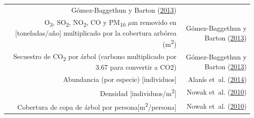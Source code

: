 \documentclass[12pt,a4paper,oneside, openany]{book}
\theoremstyle{definition}
\theoremstyle{definition}
\theoremstyle{definition}
\theoremstyle{remark}
\begin{document}
\begin{longtable}[]{@{}rr@{}}
\begin{minipage}[t]{0.31\columnwidth}
Gómez-Baggethun y Barton
(\protect\hyperlink{ref-gomez-baggethun_classifying_2013}{2013})\strut
\end{minipage}\tabularnewline
\begin{minipage}[t]{0.57\columnwidth}\raggedleft\strut
O\textsubscript{3}, SO\textsubscript{2}, NO\textsubscript{2}, CO y
PM\textsubscript{10} \(\mu\)m removido en {[}toneladas/año{]}
multiplicado por la cobertura arbórea (m\textsuperscript{2})\strut
\end{minipage} & \begin{minipage}[t]{0.31\columnwidth}\raggedleft\strut
Gómez-Baggethun y Barton
(\protect\hyperlink{ref-gomez-baggethun_classifying_2013}{2013})\strut
\end{minipage}\tabularnewline
\begin{minipage}[t]{0.57\columnwidth}\raggedleft\strut
Secuestro de CO\textsubscript{2} por árbol (carbono multiplicado por
3.67 para convertir a CO2)\strut
\end{minipage} & \begin{minipage}[t]{0.31\columnwidth}\raggedleft\strut
Gómez-Baggethun y Barton
(\protect\hyperlink{ref-gomez-baggethun_classifying_2013}{2013})\strut
\end{minipage}\tabularnewline
\begin{minipage}[t]{0.57\columnwidth}\raggedleft\strut
Abundancia (por especie) {[}individuos{]}\strut
\end{minipage} & \begin{minipage}[t]{0.31\columnwidth}\raggedleft\strut
Alanís et~al.
(\protect\hyperlink{ref-alanis_estructura_2014}{2014})\strut
\end{minipage}\tabularnewline
\begin{minipage}[t]{0.57\columnwidth}\raggedleft\strut
Densidad {[}individuos/m\textsuperscript{2}{]}\strut
\end{minipage} & \begin{minipage}[t]{0.31\columnwidth}\raggedleft\strut
Nowak et~al. (\protect\hyperlink{ref-nowak_sustaining_2010}{2010})\strut
\end{minipage}\tabularnewline
\begin{minipage}[t]{0.57\columnwidth}\raggedleft\strut
Cobertura de copa de árbol por
persona{[}m\textsuperscript{2}/persona{]}\strut
\end{minipage} & \begin{minipage}[t]{0.31\columnwidth}\raggedleft\strut
Nowak et~al. (\protect\hyperlink{ref-nowak_sustaining_2010}{2010})\strut
\end{minipage}\tabularnewline

\end{longtable}
\end{document}
